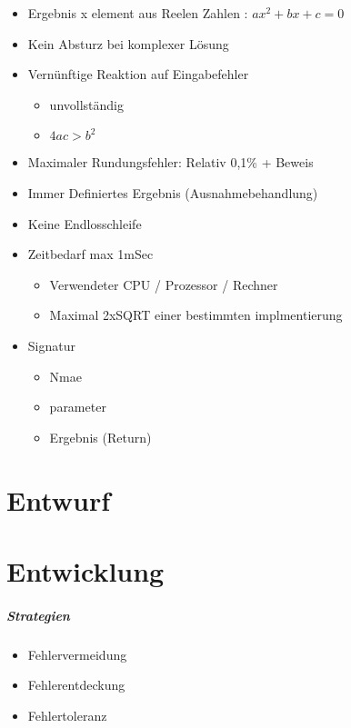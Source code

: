 \begin{itemize}
\item Ergebnis x element aus Reelen Zahlen : $ax^2+bx+c=0$
\item Kein Absturz bei komplexer Lösung
\item {
Vernünftige Reaktion auf Eingabefehler
\begin{itemize}
\item unvollständig
\item $4ac > b^2$
\end{itemize}
}
\item Maximaler Rundungsfehler: Relativ 0,1\% + Beweis
\item Immer Definiertes Ergebnis (Ausnahmebehandlung)
\item Keine Endlosschleife
\item {
Zeitbedarf max 1mSec
\begin{itemize}
\item Verwendeter CPU / Prozessor / Rechner
\item Maximal 2xSQRT einer bestimmten implmentierung
\end{itemize}
}
\item {
Signatur
\begin{itemize}
\item Nmae
\item parameter
\item Ergebnis (Return)
\end{itemize}
}
\end{itemize}


\chapter{Entwurf}


\chapter{Entwicklung}

\paragraph{Strategien}
\begin{itemize}
\item Fehlervermeidung
\item Fehlerentdeckung
\item Fehlertoleranz
\end{itemize}

